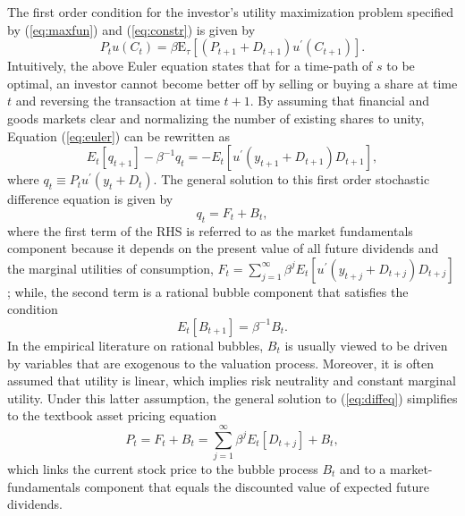 \documentclass[11pt]{article}
\begin{document}
The first order condition for the investor's utility maximization problem specified by (\ref{eq:maxfun}) and (\ref{eq:constr}) is given by
\begin{equation} \label{eq:euler}
P_t u(C_t)= \beta \text{E}_{\tau}[(P_{t+1}+D_{t+1})u^{\prime}(C_{t+1})].
\end{equation}
Intuitively, the above Euler equation states that for a time-path of $s$ to be optimal, an investor cannot become better off by selling or buying a share at time $t$ and reversing the transaction at time $t+1$. By assuming that financial and goods markets clear and normalizing the number of existing shares to unity, Equation (\ref{eq:euler}) can be rewritten as
\begin{equation}  \label{eq:diffeq}
E_t [q_{t+1}]-\beta^{-1}q_t= -E_t[u^{\prime}(y_{t+1}+D_{t+1})D_{t+1}],
\end{equation}
where $q_t \equiv P_t u^{\prime}(y_t+D_t)$. The general solution to this first order stochastic difference equation is given by
\begin{equation} \label{eq:gsolution}
q_t=F_t+B_t,
\end{equation}
where the first term of the RHS is referred to as the market fundamentals component because it depends on the present value of all future dividends and the marginal utilities of consumption, $F_t=\sum_{j=1}^{\infty}\beta^j E_t[u^{\prime}(y_{t+j}+D_{t+j})D_{t+j}]$; while, the second term is a rational bubble component that satisfies the condition 
\begin{equation}\label{eq:bubcond}
E_t[B_{t+1}]=\beta^{-1}B_t.
\end{equation}
In the empirical literature on rational bubbles, $B_t$ is usually viewed to be driven by variables that are exogenous to the valuation process. Moreover, it is often assumed that utility is linear, which implies risk neutrality and constant marginal utility. Under  this latter assumption, the general solution to (\ref{eq:diffeq}) simplifies to the textbook asset pricing equation 
\begin{equation}\label{eq:sol_neutral}
P_t=F_t+B_t=\sum_{j=1}^{\infty}\beta^jE_t[D_{t+j}]+B_t,
\end{equation}
which links the current stock price to the bubble process $B_t$ and to a market-fundamentals component that equals the discounted value of expected future dividends.
\end{document}
